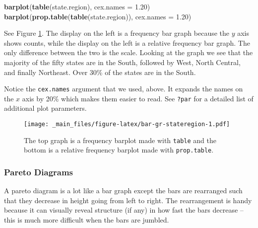 \documentclass[]{book}
\newenvironment{Shaded}{\begin{snugshade}}{\end{snugshade}}
\newcommand{\KeywordTok}[1]{\textcolor[rgb]{0.13,0.29,0.53}{\textbf{{#1}}}}
\newcommand{\DataTypeTok}[1]{\textcolor[rgb]{0.13,0.29,0.53}{{#1}}}
\newcommand{\FloatTok}[1]{\textcolor[rgb]{0.00,0.00,0.81}{{#1}}}
\newcommand{\NormalTok}[1]{{#1}}
\numberwithin{equation}{chapter}
\numberwithin{figure}{chapter}
\theoremstyle{plain}
\theoremstyle{definition}
\theoremstyle{remark}
\theoremstyle{definition}
\theoremstyle{definition}
\theoremstyle{remark}
\begin{document}
\begin{Shaded}
\begin{Highlighting}[]
\KeywordTok{barplot}\NormalTok{(}\KeywordTok{table}\NormalTok{(state.region), }\DataTypeTok{cex.names =} \FloatTok{1.20}\NormalTok{)}
\KeywordTok{barplot}\NormalTok{(}\KeywordTok{prop.table}\NormalTok{(}\KeywordTok{table}\NormalTok{(state.region)), }\DataTypeTok{cex.names =} \FloatTok{1.20}\NormalTok{)}
\end{Highlighting}
\end{Shaded}

See Figure \ref{fig:bar-gr-stateregion}. The display on the left is a
frequency bar graph because the \(y\) axis shows counts, while the
display on the left is a relative frequency bar graph. The only
difference between the two is the scale. Looking at the graph we see
that the majority of the fifty states are in the South, followed by
West, North Central, and finally Northeast. Over 30\% of the states are
in the South.

Notice the \texttt{cex.names} 
argument that we used, above. It expands the names on the \(x\) axis by
20\% which makes them easier to read. See \texttt{?par}
 for a detailed list of additional plot
parameters.

\begin{figure}[htbp]
\centering
\texttt{[image: \_main\_files/figure-latex/bar-gr-stateregion-1.pdf]}
\caption{\label{fig:bar-gr-stateregion}\small The top graph is a frequency barplot made
with \texttt{table} and the bottom is a relative frequency barplot made
with \texttt{prop.table}.}
\end{figure}





\subsubsection{Pareto Diagrams}\label{par-pareto-diagrams}

A pareto diagram is a lot like a bar graph except the bars are
rearranged such that they decrease in height going from left to right.
The rearrangement is handy because it can visually reveal structure (if
any) in how fast the bars decrease -- this is much more difficult when
the bars are jumbled.

\bigskip
\end{document}
